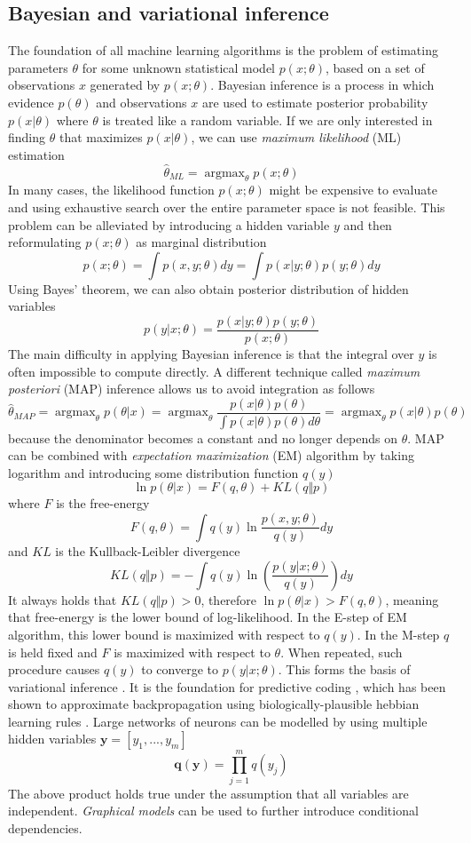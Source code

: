 \documentclass[12pt]{article}
\DeclareMathOperator*{\argmax}{argmax}
\begin{document}
\subsection{Bayesian and variational inference}

The foundation of all machine learning algorithms is the problem of estimating parameters $\theta$ for some unknown statistical model $p(x;\theta)$, based on a set of observations $x$ generated by $p(x;\theta)$.  Bayesian inference \cite{var_inf} is a process in which evidence $p(\theta)$ and observations $x$ are used to estimate posterior probability $p(x|\theta)$ where $\theta$ is treated like a random variable.
If we are only interested in finding $\theta$ that maximizes $p(x|\theta)$,  we can use \textit{maximum likelihood} (ML) estimation
\[
\hat{\theta}_{ML} = \argmax_\theta p(x;\theta)
\]
In many cases, the likelihood function $p(x;\theta)$ might be expensive to evaluate and using exhaustive search over the entire parameter space is not feasible. This problem can be alleviated by introducing a hidden variable $y$ and then reformulating $p(x;\theta)$ as marginal distribution 
\[
p(x;\theta) = \int p(x, y;\theta) dy = \int p(x|y;\theta) p(y;\theta)  dy
\]
Using Bayes' theorem, we can also obtain posterior distribution of hidden variables
\[
p(y|x;\theta) = \frac{p(x|y;\theta)p(y;\theta)}{p(x;\theta)}
\]
The main difficulty in applying Bayesian inference is that the integral over $y$ is often impossible to compute directly. A different technique called \textit{maximum posteriori} (MAP) inference allows us to avoid integration as follows
\[
\hat{\theta}_{MAP} = \argmax_\theta p(\theta|x) = \argmax_\theta \frac{p(x|\theta)p(\theta)}{\int p(x|\theta)p(\theta) d\theta} = \argmax_\theta p(x|\theta)p(\theta)
\]
because the denominator becomes a constant and no longer depends on $\theta$.
MAP can be combined with \textit{expectation maximization} (EM) \cite{em_alg} algorithm by taking logarithm and introducing some distribution function $q(y)$
\[
\ln p(\theta | x) = F(q,\theta) + KL(q\Vert p) 
\]
where $F$ is the free-energy
\[
F(q,\theta) = \int q(y) \ln \frac{p(x,y;\theta)}{q(y)} dy
\]
and $KL$ is the Kullback-Leibler divergence
\[
KL(q\Vert p) = -\int  q(y)\ln(\frac{p(y|x;\theta)}{q(y)}) dy
\]
It always holds that $KL(q\Vert p) > 0$, therefore $\ln p(\theta | x) > F(q,\theta)$,  meaning that free-energy is the lower bound of  log-likelihood. 
In the E-step of EM algorithm, this lower  bound is maximized with respect to $q(y)$. In the M-step $q$ is held fixed and $F$ is maximized with respect to $\theta$.
When repeated, such procedure causes $q(y)$ to converge to $p(y|x;\theta)$. 
This forms the basis of variational inference \cite{var_inf}. It is the foundation for predictive coding \cite{pred_coding, free_energy_principle_and_brain}, which has been shown to approximate backpropagation using biologically-plausible hebbian learning rules \cite{pred_coding_comp_graph}. Large networks of neurons can be modelled by using multiple hidden variables  $\boldsymbol{y}=[y_1,...,y_m]$
\[
\boldsymbol{q}(\boldsymbol{y}) = \prod_{j=1}^{m} q(y_j)
\]
The above product holds true under the assumption that all variables are independent. \textit{Graphical models} can be used to further introduce conditional dependencies. 
\end{document}
